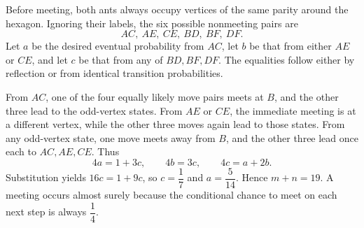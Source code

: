 Before meeting, both ants always occupy vertices of the same parity around the hexagon. Ignoring their labels, the six possible nonmeeting pairs are
\[
AC,\ AE,\ CE,\ BD,\ BF,\ DF.
\]
Let $a$ be the desired eventual probability from $AC$, let $b$ be that from either $AE$ or $CE$, and let $c$ be that from any of $BD,BF,DF$. The equalities follow either by reflection or from identical transition probabilities.

From $AC$, one of the four equally likely move pairs meets at $B$, and the other three lead to the odd-vertex states. From $AE$ or $CE$, the immediate meeting is at a different vertex, while the other three moves again lead to those states. From any odd-vertex state, one move meets away from $B$, and the other three lead once each to $AC,AE,CE$. Thus
\[
4a=1+3c,\qquad4b=3c,\qquad4c=a+2b.
\]
Substitution yields $16c=1+9c$, so $c=\dfrac{1}{7}$ and $a=\dfrac{5}{14}$. Hence $\boxed{m+n=19}$. A meeting occurs almost surely because the conditional chance to meet on each next step is always $\dfrac{1}{4}$.
